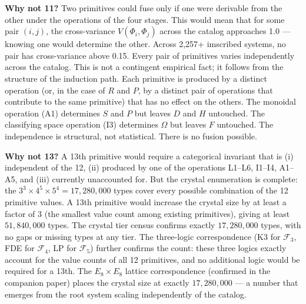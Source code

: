 \documentclass[12pt,a4paper]{article}
\begin{document}
\textbf{Why not 11?} Two primitives could fuse only if one were derivable from the other under the operations of the four stages. This would mean that for some pair $(i,j)$, the cross-variance $V(Φ_i, Φ_j)$ across the catalog approaches 1.0 --- knowing one would determine the other. Across 2,257+ imscribed systems, no pair has cross-variance above 0.15. Every pair of primitives varies independently across the catalog. This is not a contingent empirical fact; it follows from the structure of the induction path. Each primitive is produced by a distinct operation (or, in the case of $R$ and $P$, by a distinct pair of operations that contribute to the same primitive) that has no effect on the others. The monoidal operation (A1) determines $S$ and $P$ but leaves $D$ and $H$ untouched. The classifying space operation (I3) determines $\Omega$ but leaves $F$ untouched. The independence is structural, not statistical. There is no fusion possible.

\textbf{Why not 13?} A 13th primitive would require a categorical invariant that is (i) independent of the 12, (ii) produced by one of the operations L1--L6, I1--I4, A1--A5, and (iii) currently unaccounted for. But the crystal enumeration is complete: the $3^3 \times 4^5 \times 5^4 = 17{,}280{,}000$ types cover every possible combination of the 12 primitive values. A 13th primitive would increase the crystal size by at least a factor of 3 (the smallest value count among existing primitives), giving at least $51{,}840{,}000$ types. The crystal tier census confirms exactly $17{,}280{,}000$ types, with no gaps or missing types at any tier. The three-logic correspondence (K3 for $\mathcal{F}_3$, FDE for $\mathcal{F}_4$, LP for $\mathcal{F}_5$) further confirms the count: these three logics exactly account for the value counts of all 12 primitives, and no additional logic would be required for a 13th. The $E_8 \times E_8$ lattice correspondence (confirmed in the companion paper) places the crystal size at exactly $17{,}280{,}000$ --- a number that emerges from the root system scaling independently of the catalog.
\end{document}
